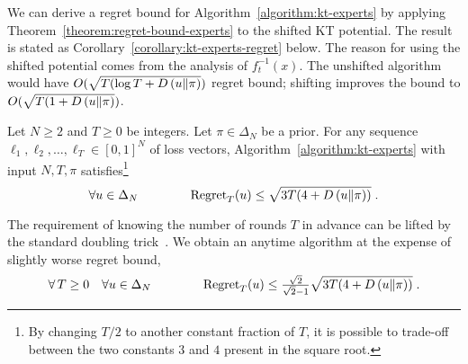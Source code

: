 We can derive a regret bound for Algorithm~\ref{algorithm:kt-experts} by
applying Theorem~\ref{theorem:regret-bound-experts} to the shifted KT potential.
The result is stated as Corollary~\ref{corollary:kt-experts-regret} below.
The reason for using the shifted
potential comes from the analysis of $f_t^{-1}(x)$. The unshifted algorithm would
have $O(\sqrt{T (\log T + D\left({u}\middle\|{\pi}\right)})$ regret bound; shifting improves the
bound to $O(\sqrt{T (1 + D\left({u}\middle\|{\pi}\right)})$.

\begin{corollary}
\label{corollary:kt-experts-regret}
Let $N \ge 2$ and $T \ge 0$ be integers. Let $\pi \in \Delta_N$ be a prior.
For any sequence $\ell_1, \ell_2, \dots, \ell_T \in
[0,1]^N$ of loss vectors, Algorithm~\ref{algorithm:kt-experts}
with input $N,T,\pi$ satisfies\footnote{By changing $T/2$ to another constant
fraction of $T$, it is possible to trade-off between the two constants $3$ and
$4$ present in the square root.}
$$
\forall u \in \Delta_N \qquad \qquad \operatorname{Regret}_T(u) \le \sqrt{3T (4 + D\left({u}\middle\|{\pi}\right))} \; .
$$
\end{corollary}


The requirement of knowing the number of rounds $T$ in advance can be lifted by
the standard doubling trick~\citep[Section 2.3.1]{Shalev-Shwartz12}. We obtain
an anytime algorithm at the expense of slightly worse regret bound,
$$
\forall \, T \ge 0 \quad \forall u \in \Delta_N \qquad \qquad
\operatorname{Regret}_T(u) \le \tfrac{\sqrt{2}}{\sqrt{2} - 1} \sqrt{3T (4 + D\left({u}\middle\|{\pi}\right))} \; .
$$

